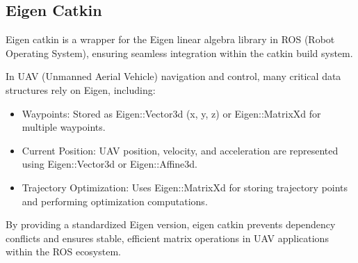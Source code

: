 \documentclass{article}
\begin{document}
\subsection{Eigen Catkin}
Eigen catkin is a wrapper for the Eigen linear algebra library in ROS (Robot Operating System), ensuring seamless integration within the catkin build system.

In UAV (Unmanned Aerial Vehicle) navigation and control, many critical data structures rely on Eigen, including:
\begin{itemize}
    \item Waypoints: Stored as Eigen::Vector3d (x, y, z) or Eigen::MatrixXd for multiple waypoints.
    \item Current Position: UAV position, velocity, and acceleration are represented using Eigen::Vector3d or Eigen::Affine3d.
    \item Trajectory Optimization: Uses Eigen::MatrixXd for storing trajectory points and performing optimization computations.

\end{itemize}

By providing a standardized Eigen version, eigen catkin prevents dependency conflicts and ensures stable, efficient matrix operations in UAV applications within the ROS ecosystem.


\end{document}
